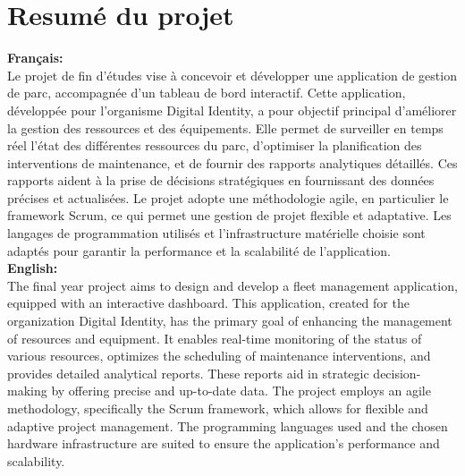 \chapter*{Resumé du projet}


\noindent
\textbf{Français:}\\
Le projet de fin d'études vise à concevoir et développer une application de gestion de parc, accompagnée d'un tableau de bord interactif. Cette application, développée pour l'organisme Digital Identity, a pour objectif principal d'améliorer la gestion des ressources et des équipements. Elle permet de surveiller en temps réel l'état des différentes ressources du parc, d'optimiser la planification des interventions de maintenance, et de fournir des rapports analytiques détaillés. Ces rapports aident à la prise de décisions stratégiques en fournissant des données précises et actualisées. Le projet adopte une méthodologie agile, en particulier le framework Scrum, ce qui permet une gestion de projet flexible et adaptative. Les langages de programmation utilisés et l'infrastructure matérielle choisie sont adaptés pour garantir la performance et la scalabilité de l'application.\\

\noindent
\textbf{English:}\\
The final year project aims to design and develop a fleet management application, equipped with an interactive dashboard. This application, created for the organization Digital Identity, has the primary goal of enhancing the management of resources and equipment. It enables real-time monitoring of the status of various resources, optimizes the scheduling of maintenance interventions, and provides detailed analytical reports. These reports aid in strategic decision-making by offering precise and up-to-date data. The project employs an agile methodology, specifically the Scrum framework, which allows for flexible and adaptive project management. The programming languages used and the chosen hardware infrastructure are suited to ensure the application's performance and scalability.\\




